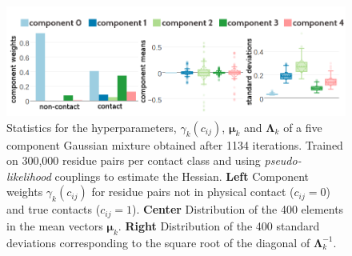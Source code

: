 \documentclass[11pt,a4paper,twoside]{book}
\newcommand{\eq}{\!=\!}
\newcommand{\Lk}{\mathbf{\Lambda}_k}
\newcommand{\muk}{\mathbf{\mu}_k}
\newcommand{\cij}{c_{ij}}
\theoremstyle{definition}
\theoremstyle{definition}
\theoremstyle{remark}
\begin{document}
\begin{figure}
\includegraphics[width=1\linewidth]{img/bayesian_model/pll/5/stats-pll-5comp-300k_contactthr25} \caption{Statistics for the hyperparameters,
\(\gamma_k(\cij)\), \(\muk\) and \(\Lk\) of a five component Gaussian
mixture obtained after 1134 iterations. Trained on 300,000 residue pairs
per contact class and using \emph{pseudo-likelihood} couplings to
estimate the Hessian. \textbf{Left} Component weights \(\gamma_k(\cij)\)
for residue pairs not in physical contact (\(\cij \eq 0\)) and true
contacts (\(\cij \eq 1\)). \textbf{Center} Distribution of the 400
elements in the mean vectors \(\muk\). \textbf{Right} Distribution of
the 400 standard deviations corresponding to the square root of the
diagonal of \(\Lk^{-1}\).}\label{fig:stats-pll-5comp-300k}
\end{figure}
\end{document}
